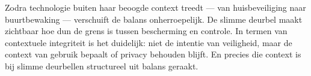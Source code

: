 \documentclass[nonacm, sigconf, balance=true]{acmart}
\begin{document}
    Zodra technologie buiten haar beoogde context treedt — van huisbeveiliging naar buurtbewaking — verschuift de balans onherroepelijk.
    De slimme deurbel maakt zichtbaar hoe dun de grens is tussen bescherming en controle.
    In termen van contextuele integriteit is het duidelijk: niet de intentie van veiligheid, maar de context van gebruik bepaalt of privacy behouden blijft.
    En precies die context is bij slimme deurbellen structureel uit balans geraakt.

    \printbibliography
\end{document}
